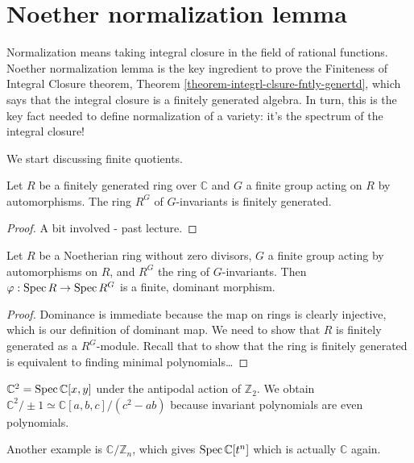\section{Noether normalization lemma}
\label{section-noether-normalization}

\noindent
Normalization means taking integral closure
in the field of rational functions.
Noether normalization lemma is the key
ingredient to prove the Finiteness of
Integral Closure theorem,
Theorem
\ref{theorem-integrl-clsure-fntly-genertd},
which says that the integral closure
is a finitely generated algebra.
In turn, this is the key fact needed
to define normalization of a variety:
it's the spectrum of the integral closure!

\medskip\noindent
We start discussing finite quotients.

\begin{theorem}
\label{theorem-noether-g-invariants}
Let $R$ be a finitely generated
ring over $\mathbb{C}$ and $G$ a finite
group acting on $R$ by automorphisms.
The ring $R^G$ of $G$-invariants
is finitely generated.
\end{theorem}

\begin{proof}
A bit involved - past lecture.
\end{proof}

\begin{lemma}
\label{lemma-g-invariants-surjective}
Let $R$ be a Noetherian ring without
zero divisors, $G$ a finite group
acting by automorphisms on $R$,
and $R^G$ the ring of $G$-invariants.
Then $\varphi:\mathop{\mathrm{Spec}} R \to \mathop{\mathrm{Spec}} R^G$
is a finite, dominant morphism.
\end{lemma}

\begin{proof}
Dominance is immediate because the map
on rings
is clearly injective, which is our
definition of dominant map.
We need to show that $R$ is finitely
generated
as a $R^G$-module.
Recall that to show that the ring
is finitely generated is equivalent
to finding minimal polynomials…
\end{proof}

\begin{example}
\label{example-quotient-singularity}
$\mathbb{C}^2=\mathop{\mathrm{Spec}}\mathbb{C}[x,y]$
under the antipodal action of $\mathbb{Z}_2$.
We obtain $\mathbb{C}^2/\pm 1
\simeq \mathbb{C}[a,b,c]/(c^2-ab)$
because invariant polynomials are
even polynomials.

Another example is $\mathbb{C}/\mathbb{Z}_n$,
which gives $\mathop{\mathrm{Spec}} \mathbb{C}[t^n]$
which is actually $\mathbb{C}$ again.
\end{example}

